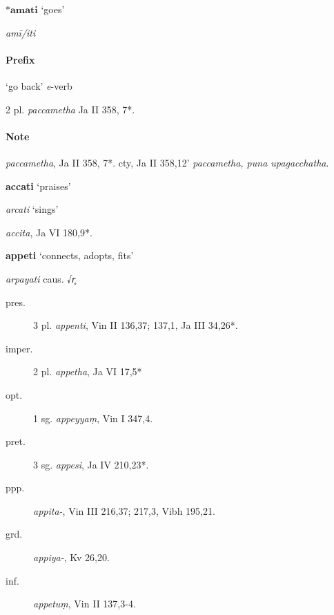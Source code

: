 \documentclass[11pt]{article}
\newcommand*\ṛ{r\symbol{"325}}
\newcommand*\Ṛ{R\symbol{"325}}
\newcommand*\ṝ{r\symbol{"304}\symbol{"325}}
\newcommand*\Ṝ{R\symbol{"304}\symbol{"325}}
\newcommand*\ḷ{l\symbol{"325}}
\newcommand*\ḹ{l\symbol{"304}\symbol{"325}}
\newcommand*\Ḷ{L\symbol{"325}}
\newcommand*\Ḹ{L\symbol{"304}\symbol{"325}}
\begin{document}
%
% 
\begin{center}
{\Large
$*\textbf{amati}$ `goes'
}
\end{center}
\begin{description}[leftmargin=\parindent]
\item[skt.] \textit{amī/iti}
\end{description}
\paragraph*{Prefix}
\begin{description}[leftmargin=\parindent]
\item[pati-] `go back' \textit{e}-verb
\item[imper.] 2 pl. \textit{paccametha} Ja II 358, 7*. 
\end{description}
\paragraph*{Note}
\textit{paccametha}, Ja II 358, 7*.
cty, Ja II 358,12' \textit{paccametha, puna upagacchatha}.

%
%
\begin{center}
{\Large
\textbf{accati} `praises'
}
\end{center}
\begin{description}[leftmargin=\parindent]
\item[skt.] \textit{arcati} `sings'
\end{description}
\begin{description}[leftmargin=\parindent]
\item[ppp.] \textit{accita}, Ja VI 180,9*.\\
\end{description}

%
%
\begin{center}
{\Large
\textbf{appeti} `connects, adopts, fits'
}
\end{center}
\begin{description}[leftmargin=\parindent]
\item[skt.] \textit{arpayati} caus. √\textit{r̥}
\end{description}
\begin{description}
\item[pres.] 3 pl. \textit{appenti}, Vin II 136,37; 137,1, Ja III 34,26*.
\item[imper.] 2 pl. \textit{appetha}, Ja VI 17,5* 
\item[opt.]  1 sg. \textit{appeyyaṃ}, Vin I 347,4.
\item[pret.] 3 sg. \textit{appesi}, Ja IV 210,23*.
\item[ppp.] \textit{appita-}, Vin III 216,37; 217,3, Vibh 195,21.
\item[grd.] \textit{appiya-}, Kv 26,20.
\item[inf.] \textit{appetuṃ}, Vin II 137,3-4.
\end{description}
\end{document}
